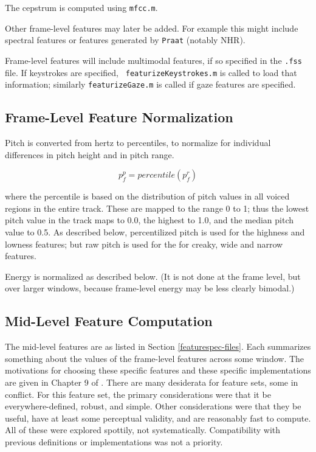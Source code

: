 \documentclass[11pt]{article}
\begin{document}
The cepstrum is computed using {\tt mfcc.m}.

Other frame-level features may later be added.  For example this might
include spectral features or features generated by {\tt Praat}
(notably NHR).

Frame-level features will include multimodal features, if so specified
in the {\tt .fss} file.  If keystrokes are specified, {\tt
  featurizeKeystrokes.m} is called to load that information; similarly
{\tt featurizeGaze.m} is called if gaze features are specified.

\subsection{Frame-Level Feature  Normalization}

Pitch is converted from hertz to percentiles, to normalize for
individual differences in pitch height and in pitch range.

\begin{equation}
p_f^p = percentile(p_f^r)
\end{equation}

where the percentile is based on the distribution of pitch values in
all voiced regions in the entire track.  These are mapped to the range
0 to 1; thus the lowest pitch value in the track maps to 0.0, the
highest to 1.0, and the median pitch value to 0.5.  As described
below, percentilized pitch is used for the highness and lowness
features; but raw pitch is used for the for creaky, wide and narrow
features.

Energy is normalized as described below. (It is not done at the frame
level, but over larger windows, because  frame-level
energy may be less clearly bimodal.)


\subsection{Mid-Level Feature Computation}   \label{other-features}

The mid-level features are as listed in Section
\ref{featurespec-files}.  Each summarizes something about the values
of the frame-level features across some window.  The motivations for
choosing these specific features and these specific implementations
are given in Chapter 9 of \cite{me-cup}.  There are many desiderata
for feature sets, some in conflict.  For this feature set, the primary
considerations were that it be everywhere-defined, robust, and simple.
Other considerations were that they be useful, have at least some
perceptual validity, and are reasonably fast to compute.  All of these
were explored spottily, not systematically.  Compatibility with
previous definitions or implementations was not a priority.
\end{document}
